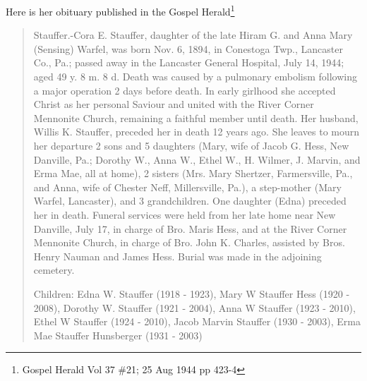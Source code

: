 Here is her obituary published in the Gospel Herald\footnote{Gospel Herald Vol 37 \#21; 25 Aug 1944 pp 423-4}
\begin{quotation}
Stauffer.-Cora E. Stauffer, daughter of the late Hiram G. and Anna Mary (Sensing) Warfel, was born Nov. 6, 1894, in Conestoga Twp., Lancaster Co., Pa.; passed away in the Lancaster General Hospital, July 14, 1944; aged 49 y. 8 m. 8 d. Death was caused by a pulmonary embolism following a major operation 2 days before death. In early girlhood she accepted Christ as her personal Saviour and united with the River Corner Mennonite Church, remaining a faithful member until death. Her husband, Willis K. Stauffer, preceded her in death 12 years ago. She leaves to mourn her departure 2 sons and 5 daughters (Mary, wife of Jacob G. Hess, New Danville, Pa.; Dorothy W., Anna W., Ethel W., H. Wilmer, J. Marvin, and Erma Mae, all at home), 2 sisters (Mrs. Mary Shertzer, Farmersville, Pa., and Anna, wife of Chester Neff, Millersville, Pa.), a step-mother (Mary Warfel, Lancaster), and 3 grandchildren. One daughter (Edna) preceded her in death. Funeral services were held from her late home near New Danville, July 17, in charge of Bro. Maris Hess, and at the River Corner Mennonite Church, in charge of Bro. John K. Charles, assisted by Bros. Henry Nauman and James Hess. Burial was made in the adjoining cemetery.

Children: Edna W. Stauffer (1918 - 1923), Mary W Stauffer Hess (1920 - 2008), Dorothy W. Stauffer (1921 - 2004), Anna W Stauffer (1923 - 2010), Ethel W Stauffer (1924 - 2010), Jacob Marvin Stauffer (1930 - 2003), Erma Mae Stauffer Hunsberger (1931 - 2003)
\end{quotation}
